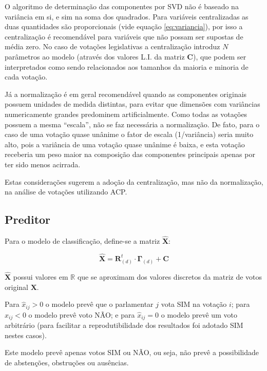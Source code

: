\documentclass[a4paper, 12pt]{article}
\begin{document}
O algoritmo de determinação das componentes por SVD não é baseado na variância em si, e sim na soma dos quadrados. Para variáveis centralizadas as duas quantidades são proporcionais (vide equação \ref{eq:variancia}), por isso a centralização é recomendável para variáveis que não possam ser supostas de média zero. No caso de votações legislativas a centralização introduz $N$ parâmetros ao modelo (através dos valores L.I. da matriz $\mathbf{C}$), que podem ser interpretados como sendo relacionados aos tamanhos da maioria e minoria de cada votação.

Já a normalização é em geral recomendável quando as componentes originais possuem unidades de medida distintas, para evitar que dimensões com variâncias numericamente grandes predominem artificialmente. Como todas as votações possuem a mesma ``escala'', não se faz necessária a normalização. De fato, para o caso de uma votação quase unânime o fator de escala (1/variância) seria muito alto, pois a variância de uma votação quase unânime é baixa, e esta votação receberia um peso maior na composição das componentes principais apenas por ter sido menos acirrada.

Estas considerações sugerem a adoção da centralização, mas não da normalização, na análise de votações utilizando ACP.

\subsection*{Preditor}

Para o modelo de classificação, define-se a matriz $\mathbf{\widehat{X}}$:

\begin{equation}
  \widehat{\mathbf{X}} = \mathbf{R}_{(d)}^{t} \cdot \mathbf{\Gamma}_{(d)} + \mathbf{C}
\end{equation}

$\widehat{\mathbf{X}}$ possui valores em $\mathbb{R}$ que se aproximam dos valores discretos da matriz de votos original $\mathbf{X}$.

Para $\widehat{x}_{ij} > 0$ o modelo prevê que o parlamentar $j$ vota SIM na votação $i$; para $\widehat{x}_{ij} < 0$ o modelo prevê voto NÃO; e para $\widehat{x}_{ij} = 0$ o modelo prevê um voto arbitrário (para facilitar a reprodutibilidade dos resultados foi adotado SIM nestes casos).

Este modelo prevê apenas votos SIM ou NÃO, ou seja, não prevê a possibilidade de abstenções, obstruções ou ausências.
\end{document}
